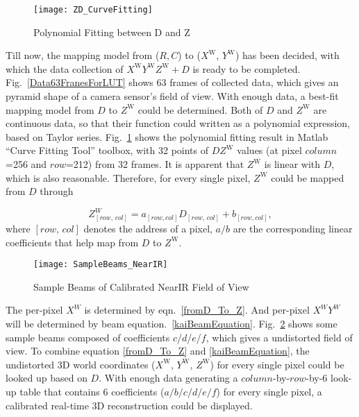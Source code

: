 %
\begin{figure}[t]
\centering
\texttt{[image: ZD\_CurveFitting]}
\caption{Polynomial Fitting between D and Z}
\label{ZD_CurveFitting}
\end{figure}%
%
Till now, the mapping model from (\(R, C\)) to (\(X^\text{W}, \, Y^\text{W}\)) has been decided, with which the data collection of \(X^\text{W}Y^\text{W}Z^\text{W}+D\) is ready to be completed. Fig.~\ref{Data63FranesForLUT} shows 63 frames of collected data, which gives an pyramid shape of a camera sensor's field of view. With enough data, a best-fit mapping model from \(D\) to \(Z^\text{W}\) could be determined. Both of \(D\) and \(Z^\text{W}\) are continuous data, so that their function could written as a polynomial expression, based on Taylor series. Fig.~\ref{ZD_CurveFitting} shows the polynomial fitting result in Matlab \enquote{Curve Fitting Tool} toolbox, with 32 points of \(DZ^\text{W}\) values (at pixel \(column\)=256 and \(row\)=212) from 32 frames. It is apparent that \(Z^\text{W}\) is linear with \(D\), which is also reasonable. Therefore, for every single pixel, \(Z^\text{W}\) could be mapped from \(D\) through \par
%
\begin{equation}
Z^W_{[row, \, col]} = a_{[row, col]}D_{[row, \, col]}+b_{[row, col]} ,
\label{fromD_To_Z}
\end{equation}%
%
\noindent
where \({[row, \, col]}\) denotes the address of a pixel, \(a/b\) are the corresponding linear coefficients that help map from \(D\) to \(Z^\text{W}\). 
\\\indent%
%
\begin{figure}[t]
\centering
\texttt{[image: SampleBeams\_NearIR]}
\caption{Sample Beams of Calibrated NearIR Field of View}
\label{SampleBeams_NearIR}
\end{figure}
%
The per-pixel \(X^W\) is determined by eqn.~\ref{fromD_To_Z}. And per-pixel \(X^WY^W\) will be determined by beam equation.~\ref{kaiBeamEquation}. Fig.~\ref{SampleBeams_NearIR} shows some sample beams composed of coefficients \(c\)/\(d\)/\(e\)/\(f\), which gives a undistorted field of view. To combine equation \ref{fromD_To_Z} and \ref{kaiBeamEquation}, the undistorted 3D world coordinates (\(X^\text{W}, \, Y^\text{W}, \, Z^\text{W}\)) for every single pixel could be looked up based on \(D\). With enough data generating a \(column\)-by-\(row\)-by-\(6\) look-up table that contains 6 coefficients (\(a/b/c/d/e/f\)) for every single pixel, a calibrated real-time 3D reconstruction could be displayed.
%
%
%
%
